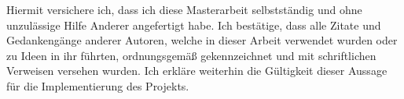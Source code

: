 Hiermit versichere ich, dass ich diese Masterarbeit selbstständig und ohne unzulässige Hilfe Anderer angefertigt habe. Ich bestätige, dass alle Zitate und Gedankengänge anderer Autoren, welche in dieser Arbeit verwendet wurden oder zu Ideen in ihr führten, ordnungsgemäß gekennzeichnet und mit schriftlichen Verweisen versehen wurden. Ich erkläre weiterhin die Gültigkeit dieser Aussage für die Implementierung des Projekts.

